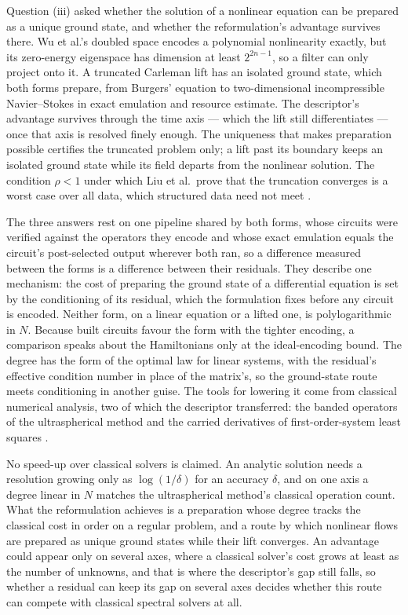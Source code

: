 Question (iii) asked whether the solution of a nonlinear equation can be prepared as a unique ground state, and whether the reformulation's advantage survives there. Wu et al.'s doubled space encodes a polynomial nonlinearity exactly, but its zero-energy eigenspace has dimension at least $2^{2n-1}$, so a filter can only project onto it. A truncated Carleman lift has an isolated ground state, which both forms prepare, from Burgers' equation to two-dimensional incompressible Navier--Stokes in exact emulation and resource estimate. The descriptor's advantage survives through the time axis --- which the lift still differentiates --- once that axis is resolved finely enough. The uniqueness that makes preparation possible certifies the truncated problem only; a lift past its boundary keeps an isolated ground state while its field departs from the nonlinear solution. The condition $\rho<1$ under which Liu et al.\ prove that the truncation converges is a worst case over all data, which structured data need not meet \cite{liu2021carleman}.

The three answers rest on one pipeline shared by both forms, whose circuits were verified against the operators they encode and whose exact emulation equals the circuit's post-selected output wherever both ran, so a difference measured between the forms is a difference between their residuals. They describe one mechanism: the cost of preparing the ground state of a differential equation is set by the conditioning of its residual, which the formulation fixes before any circuit is encoded. Neither form, on a linear equation or a lifted one, is polylogarithmic in $N$. Because built circuits favour the form with the tighter encoding, a comparison speaks about the Hamiltonians only at the ideal-encoding bound. The degree has the form of the optimal law for linear systems, with the residual's effective condition number in place of the matrix's, so the ground-state route meets conditioning in another guise. The tools for lowering it come from classical numerical analysis, two of which the descriptor transferred: the banded operators of the ultraspherical method \cite{olver2013} and the carried derivatives of first-order-system least squares \cite{cai1994fosls}.

No speed-up over classical solvers is claimed. An analytic solution needs a resolution growing only as $\log(1/\delta)$ for an accuracy $\delta$, and on one axis a degree linear in $N$ matches the ultraspherical method's classical operation count. What the reformulation achieves is a preparation whose degree tracks the classical cost in order on a regular problem, and a route by which nonlinear flows are prepared as unique ground states while their lift converges. An advantage could appear only on several axes, where a classical solver's cost grows at least as the number of unknowns, and that is where the descriptor's gap still falls, so whether a residual can keep its gap on several axes decides whether this route can compete with classical spectral solvers at all.

